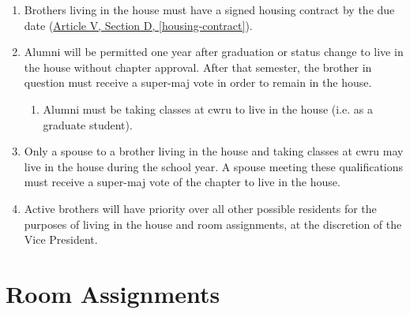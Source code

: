 \begin{enumerate}
		\item Brothers living in the house must have a signed housing contract by the due date (\hyperref[housing-contract]{Article V, Section D, \autoref*{housing-contract}}). 

		\item Alumni will be permitted one year after graduation or status change to live in the house without chapter approval. After that semester, the brother in question must receive a \gls{super-maj} vote in order to remain in the house. %
			\begin{enumerate}
				\item Alumni must be taking classes at \gls{cwru} to live in the house (i.e. as a graduate student).
			\end{enumerate}

		\item Only a spouse to a brother living in the house and taking classes at \gls{cwru} may live in the house during the school year. A spouse meeting these qualifications must receive a \gls{super-maj} vote of the chapter to live in the house.

		\item Active brothers will have priority over all other possible residents for the purposes of living in the house and room assignments, at the discretion of the Vice President.
	\end{enumerate}

\section{Room Assignments}
\label{housing}

